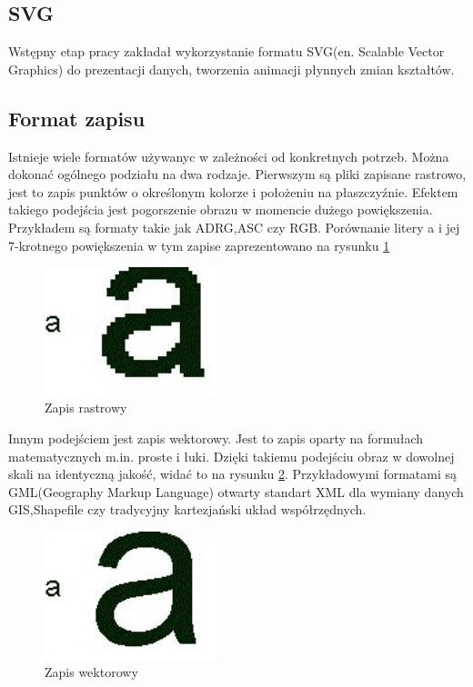 \subsection{SVG}
\label{subsec:svg}

Wstępny etap pracy zakładał wykorzystanie formatu SVG(en. Scalable Vector Graphics) do prezentacji danych, tworzenia animacji płynnych zmian kształtów.\nocite{svgbegin}\nocite{html5canvas}

\subsection{Format zapisu}
\label{subsec:zapis}

Istnieje wiele formatów używanyc w zależności od konkretnych potrzeb. Można dokonać ogólnego podziału na dwa rodzaje. Pierwszym są pliki zapisane rastrowo, jest to zapis punktów o określonym kolorze i położeniu na płaszczyźnie. Efektem takiego podejścia jest pogorszenie obrazu w momencie dużego powiększenia. Przykładem są formaty takie jak ADRG,ASC czy RGB.
Porównanie litery a i jej 7-krotnego powiększenia w tym zapise zaprezentowano na rysunku \ref{fig:rast}
  \begin{figure}[H]
  \centering
    \includegraphics[width=50mm]{ge/a2.jpg}
  \caption{Zapis rastrowy}
  \label{fig:rast}
  \end{figure}

Innym podejściem jest zapis wektorowy. Jest to zapis oparty na formułach matematycznych m.in. proste i łuki. Dzięki takiemu podejściu obraz w dowolnej skali na identyczną jakość, widać to na rysunku \ref{fig:wekt}. Przykładowymi formatami są GML(Geography Markup Language) otwarty standart XML dla wymiany danych GIS,Shapefile czy tradycyjny kartezjański układ współrzędnych.

  \begin{figure}[H]
  \centering
    \includegraphics[width=50mm]{ge/a1.jpg}
  \caption{Zapis wektorowy}
  \label{fig:wekt}
  \end{figure}

